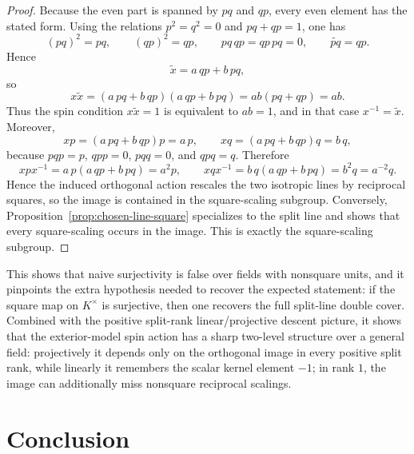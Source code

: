 \documentclass{birkjour}
\theoremstyle{plain}
\theoremstyle{definition}
\theoremstyle{remark}
\begin{document}
\begin{proof}
Because the even part is spanned by $pq$ and $qp$, every even element has the
stated form. Using the relations $p^2=q^2=0$ and $pq+qp=1$, one has
\[
  (pq)^2=pq,\qquad (qp)^2=qp,\qquad pq\,qp=qp\,pq=0,\qquad \widetilde{pq}=qp.
\]
Hence
\[
  \tilde x = a\,qp+b\,pq,
\]
so
\[
  x\tilde x
  =(a\,pq+b\,qp)(a\,qp+b\,pq)
  =ab(pq+qp)
  =ab.
\]
Thus the spin condition $x\tilde x=1$ is equivalent to $ab=1$, and in that case
$x^{-1}=\tilde x$. Moreover,
\[
  xp=(a\,pq+b\,qp)p=a\,p,\qquad xq=(a\,pq+b\,qp)q=b\,q,
\]
because $pqp=p$, $qpp=0$, $pqq=0$, and $qpq=q$. Therefore
\[
  xpx^{-1}=a\,p(a\,qp+b\,pq)=a^2p,
  \qquad
  xqx^{-1}=b\,q(a\,qp+b\,pq)=b^2q=a^{-2}q.
\]
Hence the induced orthogonal action rescales the two isotropic lines by
reciprocal squares, so the image is contained in the square-scaling subgroup.
Conversely, Proposition~\ref{prop:chosen-line-square} specializes to the split
line and shows that every square-scaling occurs in the image. This is exactly
the square-scaling subgroup.
\end{proof}

This shows that naive surjectivity is false over fields with nonsquare units,
and it pinpoints the extra hypothesis needed to recover the expected statement:
if the square map on $K^\times$ is surjective, then one recovers the full
split-line double cover. Combined with the positive split-rank
linear/projective descent picture, it shows that the exterior-model spin action
has a sharp two-level structure over a general field: projectively it depends
only on the orthogonal image in every positive split rank, while linearly it
remembers the scalar kernel element $-1$; in rank $1$, the image can
additionally miss nonsquare reciprocal scalings.

\section{Conclusion}
\label{sec:conclusion}
\end{document}
